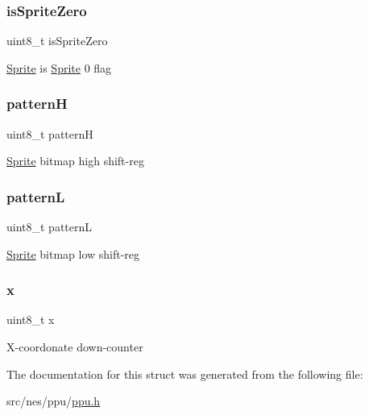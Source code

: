 \subsubsection{\texorpdfstring{is\+Sprite\+Zero}{isSpriteZero}}
{\footnotesize\ttfamily uint8\+\_\+t is\+Sprite\+Zero}

\hyperlink{struct_sprite}{Sprite} is \hyperlink{struct_sprite}{Sprite} 0 flag \mbox{\label{struct_sprite_aea33d1255f3c4b63d8467c943eb5eb8c}} 
\subsubsection{\texorpdfstring{patternH}{patternH}}
{\footnotesize\ttfamily uint8\+\_\+t patternH}

\hyperlink{struct_sprite}{Sprite} bitmap high shift-\/reg \mbox{\label{struct_sprite_a91d02c831be189ce00055deda7f1d6d2}} 
\subsubsection{\texorpdfstring{patternL}{patternL}}
{\footnotesize\ttfamily uint8\+\_\+t patternL}

\hyperlink{struct_sprite}{Sprite} bitmap low shift-\/reg \mbox{\label{struct_sprite_a0f561e77fa0f040b637f4e04f6cd8078}} 
\subsubsection{\texorpdfstring{x}{x}}
{\footnotesize\ttfamily uint8\+\_\+t x}

X-\/coordonate down-\/counter 

The documentation for this struct was generated from the following file\+:\begin{DoxyCompactItemize}
\item 
src/nes/ppu/\hyperlink{ppu_8h}{ppu.\+h}\end{DoxyCompactItemize}
